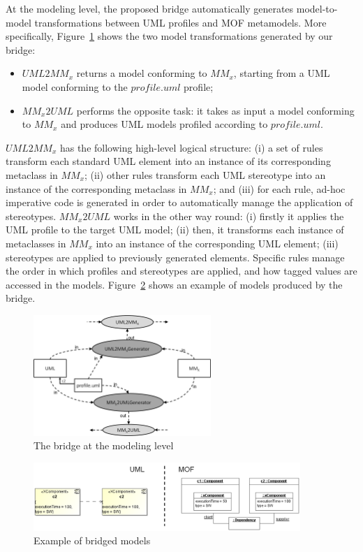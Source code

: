 At the modeling level, the proposed bridge automatically generates model-to-model transformations between UML profiles and MOF metamodels.
More specifically, Figure~\ref{fig:modelingLevel} shows the two model transformations generated by our bridge:
%
\begin{itemize}
	\item $UML2MM_x$ returns a model conforming to $MM_x$, starting from a UML model conforming to the $profile.uml$ profile;
	\item $MM_x2UML$ performs the opposite task: it takes as input a model conforming to $MM_x$
	and produces UML models profiled according to $profile.uml$.
\end{itemize}
%
$UML2MM_x$ has the following high-level logical structure: (i) a set of rules transform each standard UML element into an instance of its corresponding metaclass in $MM_x$; (ii) other rules transform each UML stereotype into an instance of the corresponding metaclass in $MM_x$; and (iii) for each rule, ad-hoc imperative code is generated in order to automatically manage the application of stereotypes. $MM_x2UML$ works in the other way round: (i) firstly it applies the UML profile to the target UML model; (ii) then, it transforms each instance of metaclasses in $MM_x$ into an instance of the corresponding UML element; (iii) stereotypes are applied to  previously generated elements. Specific rules manage the order in which profiles and stereotypes are applied, and how tagged values are accessed in the models. Figure~\ref{fig:modelingExample} shows an example of models produced by the bridge.
%
\vspace{-.4cm}
\begin{figure}[htbp]
	\centering
	\includegraphics[width=0.60\textwidth]{figures/modelingLevel.png}
	\caption{The bridge at the modeling level}
	\label{fig:modelingLevel}
\end{figure}
\vspace{-.8cm}
\begin{figure}[htbp]
	\centering
		\includegraphics[width=0.90\textwidth]{figures/modelingExample.png}
	\caption{Example of bridged models}
	\label{fig:modelingExample}
\end{figure}
\vspace{-.5cm}

